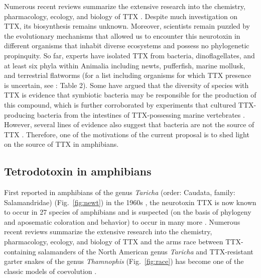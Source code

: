 Numerous recent reviews summarize the extensive research into the chemistry, pharmacology, ecology, and biology of TTX \citep[e.g.,][]{narahashi2008tetrodotoxin, hanifin2010chemical, mandal2012tetrodotoxin, bane2014tetrodotoxin, berlinck2016chemistry}. Despite much investigation on TTX, its biosynthesis remains unknown. Moreover, scientists remain puzzled by the evolutionary mechanisms that allowed us to encounter this neurotoxin in different organisms that inhabit diverse ecosystems and possess no phylogenetic propinquity. So far, experts have isolated TTX from bacteria, dinoflagellates, and at least six phyla within Animalia including newts, pufferfish, marine mollusk, and terrestrial flatworms (for a list including organisms for which TTX presence is uncertain, see \citealt{chau2011origins}: Table 2). Some have argued that the diversity of species with TTX is evidence that symbiotic bacteria may be responsible for the production of this compound, which is further corroborated by experiments that cultured TTX-producing bacteria from the intestines of TTX-possessing marine vertebrates \citep[e.g.,][]{matsui2000purification}. However, several lines of evidence also suggest that bacteria are not the source of TTX \citep{hanifin2003tetrodotoxin, lehman2004no, salvitti2015first}. Therefore, one of the motivations of the current proposal is to shed light on the source of TTX in amphibians.

\subsection{Tetrodotoxin in amphibians}

First reported in amphibians of the genus \textit{Taricha} (order: Caudata, family: Salamandridae) (Fig.~\ref{fig:newt}) in the 1960s \citep[e.g.,~][]{mosher1964tarichatoxin}, the neurotoxin TTX is now known to occur in 27 species of amphibians and is suspected (on the basis of phylogeny and aposematic coloration and behavior) to occur in many more \citep{hanifin2010chemical}. Numerous recent reviews summarize the extensive research into the chemistry, pharmacology, ecology, and biology of TTX \citep[e.g.,~][]{narahashi2008tetrodotoxin, hanifin2010chemical, mandal2012tetrodotoxin, bane2014tetrodotoxin, berlinck2016chemistry} and the arms race between TTX-containing salamanders of the North American genus \textit{Taricha} and TTX-resistant garter snakes of the genus \textit{Thamnophis}  (Fig.~\ref{fig:race}) has become one of the classic models of coevolution \citep[for a historical account and summary see~][]{williams2010tetrodotoxin}.

